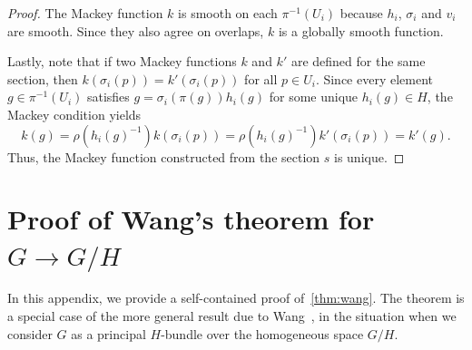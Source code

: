 \documentclass[12pt,a4paper]{article}
\numberwithin{equation}{section}
\theoremstyle{plain}
\theoremstyle{definition}
\theoremstyle{remark}
\begin{document}
\begin{proof}
    The Mackey function $k$ is smooth on each $\pi^{-1}(U_i)$ because $h_i$, $\sigma_i$ and $v_i$ are smooth. Since they also agree on overlaps, $k$ is a globally smooth function.

    Lastly, note that if two Mackey functions $k$ and $k'$ are defined for the same section, then $k(\sigma_i(p))=k'(\sigma_i(p))$ for all $p\in U_i$. Since every element $g\in\pi^{-1}(U_i)$ satisfies $g=\sigma_i(\pi(g))h_i(g)$ for some unique $h_i(g)\in H$, the Mackey condition yields
    \begin{equation}
    k(g) = \rho(h_i(g)^{-1})k(\sigma_i(p)) = \rho(h_i(g)^{-1})k'(\sigma_i(p))=k'(g).
    \end{equation} 
    Thus, the Mackey function constructed from the section $s$ is unique.
\end{proof}

\section{Proof of Wang's theorem for $G \to G/H$}\label{app:proof_of_wang}
In this appendix, we provide a self-contained proof of~\cref{thm:wang}. The theorem is a special case of the more general result due to Wang~\cite{Wang1958}, in the situation when we consider $G$ as a principal $H$-bundle over the homogeneous space $G/H$. 

\WangTheorem*
\end{document}
